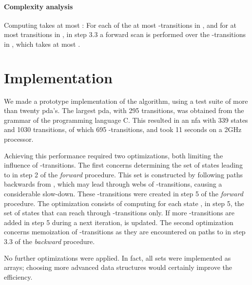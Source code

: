 \documentclass{llncs}
\begin{document}
\paragraph{Complexity analysis}
Computing  takes at most :
For each of the at most  -transitions in , and for at most 
transitions in , in step 3.3 a forward scan is performed over the -transitions in , which takes at most .

\section{Implementation}

We made a prototype implementation of the algorithm, using a test suite of more than twenty pda's.
The largest pda, with 295 transitions, was obtained from the grammar of the programming language C.
This resulted in an nfa with 339 states and 1030 transitions, of which 695 -transitions,
and took 11 seconds on a 2GHz processor.

Achieving this performance required two optimizations, both limiting
the influence of -transitions.
The first concerns determining the set of states leading to  in
step 2 of the {\em forward} procedure.
This set is constructed by following paths backwards from ,
which may lead through webs of -transitions, causing a considerable slow-down.
These -transitions were created in step 5 of the {\em forward} procedure.
The optimization consists of computing for each state , in step 5,
the set  of states that can reach  through -transitions only.
If more -transitions are added in step 5 during a next iteration,  is updated.
The second optimization concerns memoization of -transitions as they are encountered
on paths to  in step 3.3 of the {\em backward} procedure.


No further optimizations were applied. In fact, all sets were implemented as arrays;
choosing more advanced data structures would certainly improve the efficiency.












\end{document}
